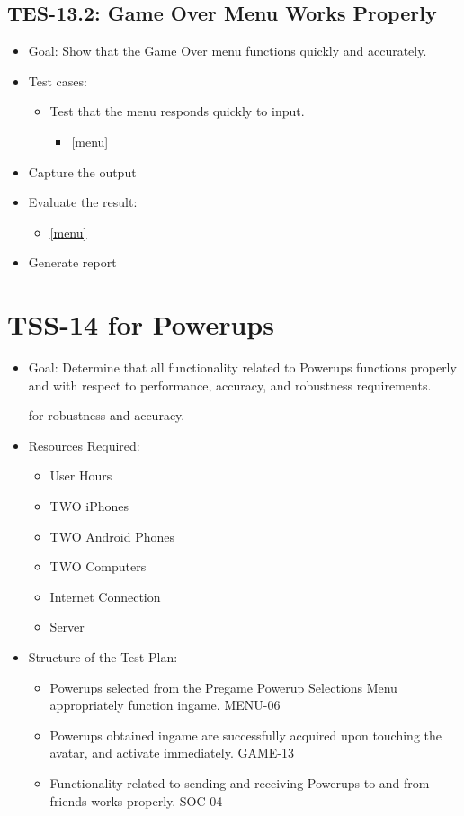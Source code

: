 \subsection{TES-13.2: Game Over Menu Works Properly }
\begin{itemize}
\item Goal: Show that the Game Over menu functions quickly and accurately. 
\item Test cases: 

\begin{itemize}
\item Test that the menu responds quickly to input.
\begin{itemize}
\item \ref{menu}
\end{itemize}
\end{itemize}
\item Capture the output 
\item Evaluate the result: 

\begin{itemize}
\item \ref{menu}
\end{itemize}
\item Generate report 
\end{itemize}



\section{TSS-14 for Powerups}
\begin{itemize}
\item Goal: Determine that all functionality related to Powerups functions properly and with respect to performance, accuracy, and robustness requirements.

for robustness and accuracy.

\item Resources Required:
\begin{itemize}
\item User Hours 
\item TWO iPhones
\item TWO Android Phones
\item TWO Computers
\item Internet Connection 
\item Server
\end{itemize}
\item Structure of the Test Plan: 

\begin{itemize}

\item Powerups selected from the Pregame Powerup Selections Menu appropriately function ingame. MENU-06
\item Powerups obtained ingame are successfully acquired upon touching the avatar, and activate immediately. GAME-13
\item Functionality related to sending and receiving Powerups to and from friends works properly. SOC-04

\end{itemize}
\end{itemize}

